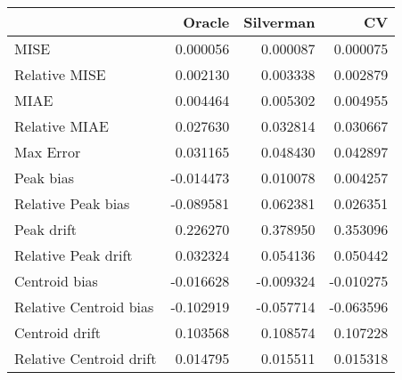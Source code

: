 \begin{tabular}{lrrr}
  \hline
 & Oracle & Silverman & CV \\ 
  \hline
MISE & 0.000056 & 0.000087 & 0.000075 \\ 
  Relative MISE & 0.002130 & 0.003338 & 0.002879 \\ 
  MIAE & 0.004464 & 0.005302 & 0.004955 \\ 
  Relative MIAE & 0.027630 & 0.032814 & 0.030667 \\ 
  Max Error & 0.031165 & 0.048430 & 0.042897 \\ 
  Peak bias & -0.014473 & 0.010078 & 0.004257 \\ 
  Relative Peak bias & -0.089581 & 0.062381 & 0.026351 \\ 
  Peak drift & 0.226270 & 0.378950 & 0.353096 \\ 
  Relative Peak drift & 0.032324 & 0.054136 & 0.050442 \\ 
  Centroid bias & -0.016628 & -0.009324 & -0.010275 \\ 
  Relative Centroid bias & -0.102919 & -0.057714 & -0.063596 \\ 
  Centroid drift & 0.103568 & 0.108574 & 0.107228 \\ 
  Relative Centroid drift & 0.014795 & 0.015511 & 0.015318 \\ 
   \hline
\end{tabular}
